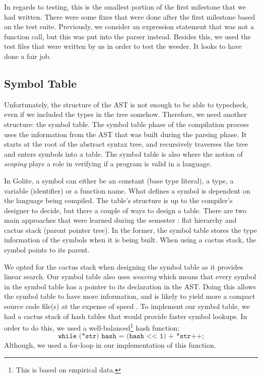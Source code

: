 \documentclass{article}
\begin{document}
In regards to testing, this is the smallest portion of the first milestone that we had written. There were some fixes that were done after the first milestone based on the test suite. Previously, we consider an expression statement that was not a function call, but this was put into the parser instead. Besides this, we used the test files that were written by us in order to test the weeder. It looks to have done a fair job.

\subsection{Symbol Table}

Unfortunately, the structure of the AST is not enough to be able to typecheck, even if we included the types in the tree somehow. Therefore, we need another structure: the symbol table. The symbol table phase of the compilation process uses the information from the AST that was built during the parsing phase. It starts at the root of the abstract syntax tree, and recursively traverses the tree and enters symbols into a table. The symbol table is also where the notion of \textit{scoping} plays a role in verifying if a program is valid in a language.

In Golite, a symbol can either be an constant (base type literal), a type, a variable (identifier) or a function name. What defines a symbol is dependent on the language being compiled. The table's structure is up to the compiler's designer to decide, but there a couple of ways to design a table. There are two main approaches that were learned during the semester \cite{symtab}: flat hierarchy and cactus stack (parent pointer tree). In the former, the symbol table stores the type information of the symbols when it is being built. When using a cactus stack, the symbol points to its parent.

We opted for the cactus stack when designing the symbol table as it provides linear search. Our symbol table also uses \textit{weaving} which means that every symbol in the symbol table has a pointer to its declaration in the AST. Doing this allows the symbol table to have more information, and is likely to yield more a compact source code file(s) at the expense of speed \cite{symtab}. To implement our symbol table, we had a cactus stack of hash tables that would provide faster symbol lookups. In order to do this, we used a well-balanced\footnote{This is based on empirical data.} hash function:
\[
    \texttt{while (*str) hash = (hash << 1) + *str++;}
\]
Although, we used a for-loop in our implementation of this function.
\end{document}
